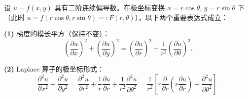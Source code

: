 \documentclass[lang=cn,11pt]{elegantbook}
\begin{document}
\begin{proposition} \label{prop:polar-laplacian}
设 $u=f(x,y)$ 具有二阶连续偏导数。在极坐标变换 $x=r\cos\theta$, $y=r\sin\theta$ 下（此时 $u=f(r\cos\theta,r\sin\theta)=:F(r,\theta)$），以下两个重要表达式成立：

\textbf{(1)} 梯度的模长平方（保持不变）：
\[
\left(\frac{\partial u}{\partial x}\right)^{\!2}
+\left(\frac{\partial u}{\partial y}\right)^{\!2}
=\left(\frac{\partial u}{\partial r}\right)^{\!2}
+\frac{1}{r^2}\left(\frac{\partial u}{\partial\theta}\right)^{\!2}.
\]

\textbf{(2)} Laplace 算子的极坐标形式：
\[
\frac{\partial^2 u}{\partial x^2}+\frac{\partial^2 u}{\partial y^2}
=\frac{\partial^2 u}{\partial r^2}
+\frac{1}{r}\frac{\partial u}{\partial r}
+\frac{1}{r^2}\frac{\partial^2 u}{\partial\theta^2}
=\frac{1}{r^2}\left[r\frac{\partial}{\partial r}\!\left(r\frac{\partial u}{\partial r}\right)
+\frac{\partial^2 u}{\partial\theta^2}\right].
\]
\end{proposition}
\end{document}
